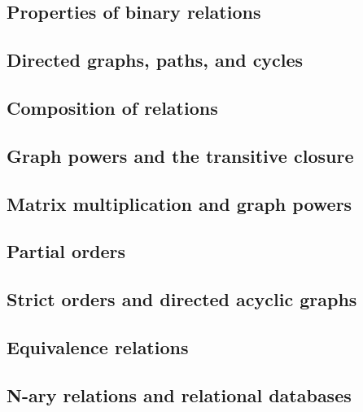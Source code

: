 \subsection{Properties of binary relations}
\subsection{Directed graphs, paths, and cycles}
\subsection{Composition of relations}
\subsection{Graph powers and the transitive closure}
\subsection{Matrix multiplication and graph powers}
\subsection{Partial orders}
\subsection{Strict orders and directed acyclic graphs}
\subsection{Equivalence relations}
\subsection{N-ary relations and relational databases}